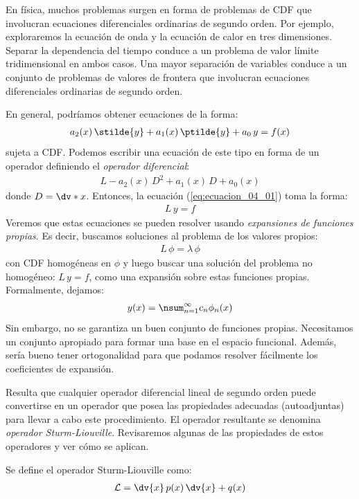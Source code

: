 En física, muchos problemas surgen en forma de problemas de CDF que involucran ecuaciones diferenciales ordinarias de segundo orden. Por ejemplo, exploraremos la ecuación de onda y la ecuación de calor en tres dimensiones. Separar la dependencia del tiempo conduce a un problema de valor límite tridimensional en ambos casos. Una mayor separación de variables conduce a un conjunto de problemas de valores de frontera que involucran ecuaciones diferenciales ordinarias de segundo orden.
\par
En general, podríamos obtener ecuaciones de la forma:
\begin{align}
a_{2} (x) \, \stilde{y} + a_{1} (x) \, \ptilde{y} + a_{0} \, y = f(x)
\label{eq:ecuacion_04_01}
\end{align}
sujeta a CDF. Podemos escribir una ecuación de este tipo en forma de un operador definiendo el \emph{operador diferencial}:
\begin{align*}
L - a_{2} (x) \, D^{2} + a_{1} (x) \, D + a_{0} (x)
\end{align*}
donde $D = \dv*{x}$. Entonces, la ecuación (\ref{eq:ecuacion_04_01}) toma la forma:
\begin{align*}
L \, y = f
\end{align*}
Veremos que estas ecuaciones se pueden resolver usando \emph{expansiones de funciones propias}. Es decir, buscamos soluciones al problema de los valores propios:
\begin{align*}
L \, \phi = \lambda \, \phi
\end{align*}
con CDF homogéneas en $\phi$ y luego buscar una solución del problema no homogéneo: $L \, y = f$, como una expansión sobre estas funciones propias. Formalmente, dejamos:
\begin{align*}
y (x) = \nsum_{n=1}^{\infty} c_{n} \phi_{n} (x)
\end{align*}
Sin embargo, no se garantiza un buen conjunto de funciones propias. Necesitamos un conjunto apropiado para formar una base en el espacio funcional. Además, sería bueno tener ortogonalidad para que podamos resolver fácilmente los coeficientes de expansión.
\par
Resulta que cualquier operador diferencial lineal de segundo orden puede convertirse en un operador que posea las propiedades adecuadas (autoadjuntas) para llevar a cabo este procedimiento. El operador resultante se denomina \emph{operador Sturm-Liouville}. Revisaremos algunas de las propiedades de estos operadores y ver cómo se aplican.
\par
Se define el operador Sturm-Liouville como:
\begin{align}
\mathcal{L} = \dv{x} \, p(x) \, \dv{x} + q(x)
\label{eq:ecuacion_04_02}
\end{align}

